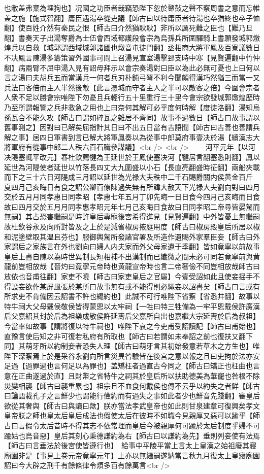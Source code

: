 也敝盖弗棄為埋狗也】况國之功臣者哉竊恐陛下忽於鼙鼔之聲不察周書之意而忘帷盖之施【施式智翻】庸臣遇湯卒從吏議【師古曰以待庸臣者待湯也卒猶終也卒子恤翻】使百姓介然有秦民之恨【師古曰介然猶耿耿】非所以厲死難之臣也【難乃旦翻】書奏天子出湯奪爵為士伍會西域都護段會宗為烏孫兵所圍驛騎上書願發城郭燉煌兵以自救【城郭謂西域城郭諸國也燉音屯徒門翻】丞相商大將軍鳳及百寮議數日不决鳳言陳湯多籌策習外國事可問上召湯見宣室湯擊郅支時中寒【見賢遍翻中竹仲翻】病兩臂不屈申湯入見有詔毋拜示以會宗奏湯對曰臣以為此必無可憂也上曰何以言之湯曰夫胡兵五而當漢兵一何者兵刃朴鈍弓弩不利今聞頗得漢巧然猶三而當一又兵法曰客倍而主人半然後敵【此言憑城而守者主人之半可以敵客之倍】今圍會宗者人衆不足以勝會宗唯陛下勿憂且兵輕行五十里重行三十里今會宗欲發城郭燉煌歷時乃至所謂報讐之兵非救急之用也上曰奈何其解可必乎度何時解【度徒洛翻】湯知烏孫瓦合不能久攻【師古曰謂如碎瓦之雜居不齊同】故事不過數日【師古曰故事謂以舊事測之】因對曰已解矣屈指計其日曰不出五日當有吉語聞【師古曰吉善也善謂兵解之事】居四日軍書到言已解大將軍鳳奏以為從事中郎莫府事壹决於湯【續漢志大將軍府有從事中郎二人秩六百石職參謀議】<br />
<br />
　　河平元年【以河决隄塞輒平改元】春杜欽薦犍為王延世於王鳳使塞决河【犍居言翻塞悉則翻】鳳以延世為河隄使者延世以竹落長四丈大九圍盛以小石【長直亮翻盛時征翻】兩船夾載而下之三十六日河隄成三月詔以延世為光禄大夫秩中二千石賜爵關内侯黄金百斤　夏四月己亥晦日有食之詔公卿百僚陳過失無有所諱大赦天下光禄大夫劉向對曰四月交於五月月同孝惠日同孝昭【孝惠七年五月丁卯先晦一日日食今四月己亥晦而日食故曰四月交於五月月同孝惠孝昭元年七月己亥晦日食故曰日同孝昭二帝尋皆晏駕而無嗣】其占恐害繼嗣是時許皇后專寵後宮希得進見【見賢遍翻】中外皆憂上無繼嗣故杜欽谷永及向所對皆及之上於是減省椒房掖庭用度【師古曰椒房殿皇后所居以椒和泥塗壁取其温且芬也】服御輿駕所發諸官署及所造作遺賜外家羣臣妾【師古曰外家謂后之家族言在外也劉向曰婦人内夫家而外父母家遺于季翻】皆如竟寧以前故事皇后上書自陳以為時世異制長短相補不出漢制而已纎微之間未必可同若竟寧前與黄龍前豈相放哉【晉灼曰竟寧元帝時也黄龍宣帝時也言二帝奢儉不同豈相放哉師古曰放依也音甫往翻】家吏不曉【師古曰家吏皇后之官屬】今壹受詔如此且使妾揺手不得設妾欲作某屏風張於某所曰故事無有或不能得則必繩妾以詔書矣【師古曰言或有所求吏不肯備因云詔書不許也繩約也】此誠不可行唯陛下省察【省悉井翻】故事以特牛祠大父母戴侯敬侯皆得蒙恩以太牢祠【一牲曰特三牲備為一牢平恩戴侯許廣漢后父嘉紹其封於后為祖樂成敬侯許延夀后父嘉所自出也嘉繼大宗延夀於后為叔祖】今當率如故事【謂將復以特牛祠也】唯陛下哀之今吏甫受詔讀記【師古曰甫始也】直豫言使后知之非可復若私府有所取也【師古曰若謂如未奉詔之前也復扶又翻下同】其萌牙所以約制妾者恐失人理【師古曰萌牙言其初始發意若草木之方生也】唯陛下深察焉上於是采谷永劉向所言災異咎驗皆在後宮之意以報之且曰吏拘於法亦安足過【過罪過也言何足以為罪也】盖矯枉者過直古今同之【師古曰矯正也枉曲也言意在正曲遂過於直】且財幣之省特牛之祠其於皇后所以扶助德美為華寵也咎根不除災變相襲【師古曰襲重累也】祖宗且不血食何戴侯也傳不云乎以約失之者鮮【師古曰論語載孔子之言鮮少也謂能行儉約而有過失之事如此者少也鮮音先踐翻】審皇后欲從其奢與【師古曰與讀曰歟】朕亦當法孝武皇帝也如此則甘泉建章可復興矣孝文皇帝朕之師也皇太后皇后成法也假使太后在彼時不如職今見親厚又惡可以踰乎【師古曰言假令太后昔時不得其志不依常理而皇后今被親厚何可踰於太后制度乎婦不可踰姑也烏音惡】皇后其刻心秉德謙約為右【師古曰以謙約為先】垂則列妾使有法焉【師古曰言垂法於後宮使皆遵行也】　給事中平陵平當上言太上皇漢之始祖廢其寢廟園非是【事見上卷元帝竟寧元年】上亦以無繼嗣遂納當言秋九月復太上皇寢廟園詔曰今大辟之刑千有餘條律令煩多百有餘萬言<br />
